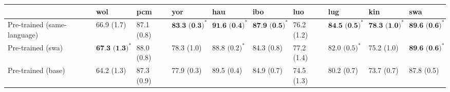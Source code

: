 \begin{tabular}{llllllllll}
\toprule
{} &                      wol &         pcm &                      yor &                      hau &                      ibo &         luo &                      lug &                      kin &                      swa \\
\midrule
Pre-trained (same-language) &               66.9 (1.7) &  87.1 (0.8) &  $\textbf{83.3 (0.3)}^*$ &  $\textbf{91.6 (0.4)}^*$ &  $\textbf{87.9 (0.5)}^*$ &  76.2 (1.2) &  $\textbf{84.5 (0.5)}^*$ &  $\textbf{78.3 (1.0)}^*$ &  $\textbf{89.6 (0.6)}^*$ \\
Pre-trained (swa)           &  $\textbf{67.3 (1.3)}^*$ &  88.0 (0.8) &               78.3 (1.0) &    $\text{88.8 (0.2)}^*$ &               84.3 (0.8) &  77.2 (1.4) &    $\text{82.0 (0.5)}^*$ &               75.2 (1.0) &  $\textbf{89.6 (0.6)}^*$ \\
Pre-trained (base)          &               64.2 (1.3) &  87.3 (0.9) &               77.9 (0.3) &               89.5 (0.4) &               84.9 (0.7) &  74.5 (1.3) &               80.2 (0.7) &               73.7 (0.7) &               87.8 (0.5) \\
\bottomrule
\end{tabular}
